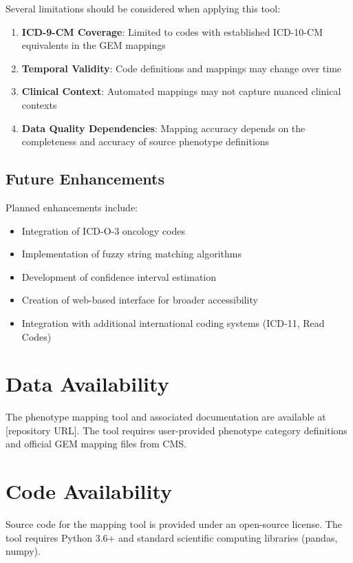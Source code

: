 \documentclass[11pt]{article}
\begin{document}
Several limitations should be considered when applying this tool:

\begin{enumerate}
    \item \textbf{ICD-9-CM Coverage}: Limited to codes with established ICD-10-CM equivalents in the GEM mappings
    \item \textbf{Temporal Validity}: Code definitions and mappings may change over time
    \item \textbf{Clinical Context}: Automated mappings may not capture nuanced clinical contexts
    \item \textbf{Data Quality Dependencies}: Mapping accuracy depends on the completeness and accuracy of source phenotype definitions
\end{enumerate}

\subsection{Future Enhancements}

Planned enhancements include:
\begin{itemize}
    \item Integration of ICD-O-3 oncology codes
    \item Implementation of fuzzy string matching algorithms
    \item Development of confidence interval estimation
    \item Creation of web-based interface for broader accessibility
    \item Integration with additional international coding systems (ICD-11, Read Codes)
\end{itemize}

\section{Data Availability}

The phenotype mapping tool and associated documentation are available at [repository URL]. The tool requires user-provided phenotype category definitions and official GEM mapping files from CMS.

\section{Code Availability}

Source code for the mapping tool is provided under an open-source license. The tool requires Python 3.6+ and standard scientific computing libraries (pandas, numpy).
\end{document}
